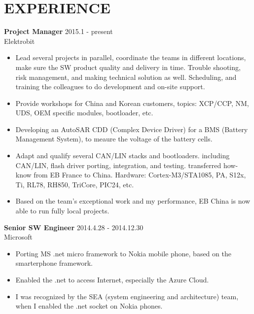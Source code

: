 
\section{EXPERIENCE}
\textbf{Project Manager} \hfill 2015.1 - present \\
        Elektrobit
        \begin{itemize}  \itemsep -2pt %
        \item Lead several projects in parallel, coordinate the teams in different locations,
            make sure the SW product quality and delivery in time.
            Trouble shooting, risk management, and making technical solution as well.
            Scheduling, and training the colleagues to do development and on-site support.
        \item Provide workshops for China and Korean customers,
            topics:
            XCP/CCP, NM, UDS, OEM specific modules, bootloader, etc.
        \item Developing an AutoSAR CDD (Complex Device Driver) for a BMS (Battery Management System),
            to meaure the voltage of the battery cells.
        \item Adapt and qualify several CAN/LIN stacks and bootloaders.
            including CAN/LIN, flash driver porting, integration, and testing.
            transferred how-know from EB France to China.
            Hardware: Cortex-M3/STA1085, PA, S12x, Ti, RL78, RH850, TriCore, PIC24, etc.
        \item Based on the team's exceptional work and my performance,
            EB China is now able to run fully local projects.
        \end{itemize}

\textbf{Senior SW Engineer} \hfill 2014.4.28 - 2014.12.30\\
        Microsoft
        \begin{itemize}  \itemsep -2pt %
                \item Porting MS .net micro framework to Nokia mobile phone, based on the smarterphone framework.
                \item Enabled the .net to access Internet, especially the Azure Cloud.
                \item I was recognized by the SEA (system engineering and architecture) team, when I enabled the .net socket on Nokia phones.
        \end{itemize}

